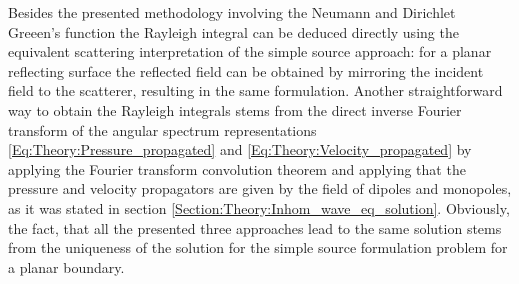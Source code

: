 \vspace{3mm}
Besides the presented methodology involving the Neumann and Dirichlet Greeen's function the Rayleigh integral can be deduced directly using the equivalent scattering interpretation of the simple source approach: for a planar reflecting surface the reflected field can be obtained by mirroring the incident field to the scatterer, resulting in the same formulation.
Another straightforward way to obtain the Rayleigh integrals stems from the direct inverse Fourier transform of the angular spectrum representations \eqref{Eq:Theory:Pressure_propagated} and \eqref{Eq:Theory:Velocity_propagated} by applying the Fourier transform convolution theorem and applying that the pressure and velocity propagators are given by the field of dipoles and monopoles, as it was stated in section \ref{Section:Theory:Inhom_wave_eq_solution}.
Obviously, the fact, that all the presented three approaches lead to the same solution stems from the uniqueness of the solution for the simple source formulation problem for a planar boundary.